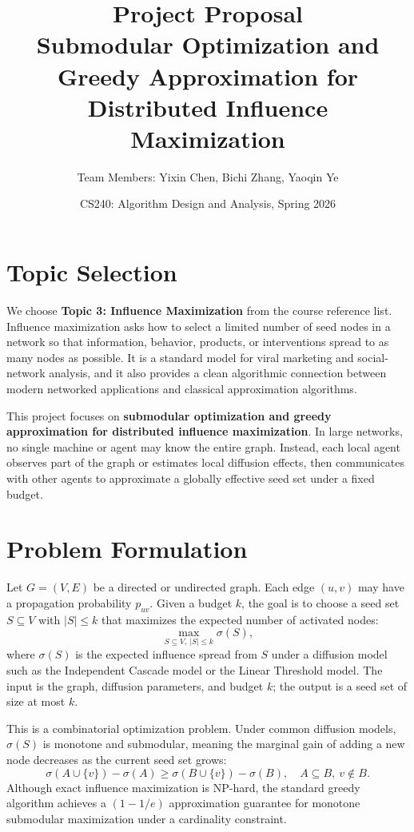 \documentclass[10pt]{article}
\title{\textbf{Project Proposal}\\
Submodular Optimization and Greedy Approximation for Distributed Influence Maximization}
\author{Team Members: Yixin Chen, Bichi Zhang, Yaoqin Ye}
\date{CS240: Algorithm Design and Analysis, Spring 2026}
\begin{document}
\maketitle

\section{Topic Selection}

We choose \textbf{Topic 3: Influence Maximization} from the course reference
list. Influence maximization asks how to select a limited number of seed nodes
in a network so that information, behavior, products, or interventions spread
to as many nodes as possible. It is a standard model for viral marketing and
social-network analysis, and it also provides a clean algorithmic connection
between modern networked applications and classical approximation algorithms.

This project focuses on \textbf{submodular optimization and greedy
approximation for distributed influence maximization}. In large networks, no
single machine or agent may know the entire graph. Instead, each local agent
observes part of the graph or estimates local diffusion effects, then
communicates with other agents to approximate a globally effective seed set
under a fixed budget.

\section{Problem Formulation}

Let $G=(V,E)$ be a directed or undirected graph. Each edge $(u,v)$ may have a
propagation probability $p_{uv}$. Given a budget $k$, the goal is to choose a
seed set $S\subseteq V$ with $|S|\leq k$ that maximizes the expected number of
activated nodes:
\[
    \max_{S\subseteq V,\ |S|\leq k} \sigma(S),
\]
where $\sigma(S)$ is the expected influence spread from $S$ under a diffusion
model such as the Independent Cascade model or the Linear Threshold model. The
input is the graph, diffusion parameters, and budget $k$; the output is a seed
set of size at most $k$.

This is a combinatorial optimization problem. Under common diffusion models,
$\sigma(S)$ is monotone and submodular, meaning the marginal gain of adding a
new node decreases as the current seed set grows:
\[
    \sigma(A\cup\{v\})-\sigma(A)
    \geq
    \sigma(B\cup\{v\})-\sigma(B),
    \quad A\subseteq B,\ v\notin B.
\]
Although exact influence maximization is NP-hard, the standard greedy
algorithm achieves a $(1-1/e)$ approximation guarantee for monotone submodular
maximization under a cardinality constraint.
\end{document}
